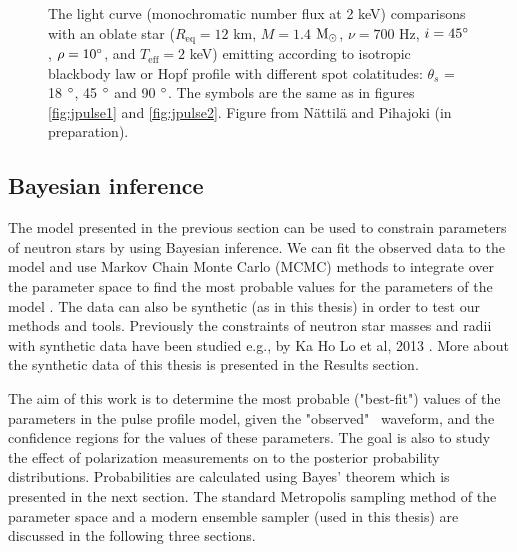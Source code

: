 \documentclass{wihuri}
\def\msun{{\rm M_{\odot}}}
\def\thetas{\theta_{s}}
\begin{document}
\begin{figure}
\centerline{}
\caption{The light curve (monochromatic number flux at 2 keV) comparisons with an oblate star ($R_{\mathrm{eq}} = 12$ km, $M = 1.4$ $\msun$, $\nu = 700$ Hz, $i = 45 \degree$, $\rho = 10 \degree$, and $T_{\mathrm{eff}} = 2$ keV) emitting according to isotropic blackbody law or Hopf profile with different spot colatitudes: $\thetas$ = 18 $\degree$, 45 $\degree$ and 90 $\degree$. The symbols are the same as in figures \ref{fig:jpulse1} and \ref{fig:jpulse2}. Figure from Nättilä and Pihajoki (in preparation).
\label{fig:jpulse3}}
\end{figure}




\subsection{Bayesian inference}



The model presented in the previous section can be used to constrain parameters of neutron stars by using Bayesian inference. We can fit the observed data to the model and use Markov Chain Monte Carlo (MCMC) methods to integrate over the parameter space to find the most probable values for the parameters of the model \cite{mc_methods_book}. The data can also be synthetic (as in this thesis) in order to test our methods and tools. %
Previously the constraints of neutron star masses and radii with synthetic data have been studied e.g., by Ka Ho Lo et al, 2013 \cite{miller}. %
More about the synthetic data of this thesis is presented in the Results section. 

The aim of this work is to determine the most probable ("best-fit") values of the parameters in the pulse profile model, given the "observed" \ 
waveform, and the confidence regions for the values of these parameters. The goal is also to study the effect of polarization measurements on to the posterior probability distributions. Probabilities are calculated using Bayes' theorem which is presented in the next section. The standard Metropolis sampling method of the parameter space and a modern ensemble sampler (used in this thesis) are discussed in the following three sections. 
\end{document}

